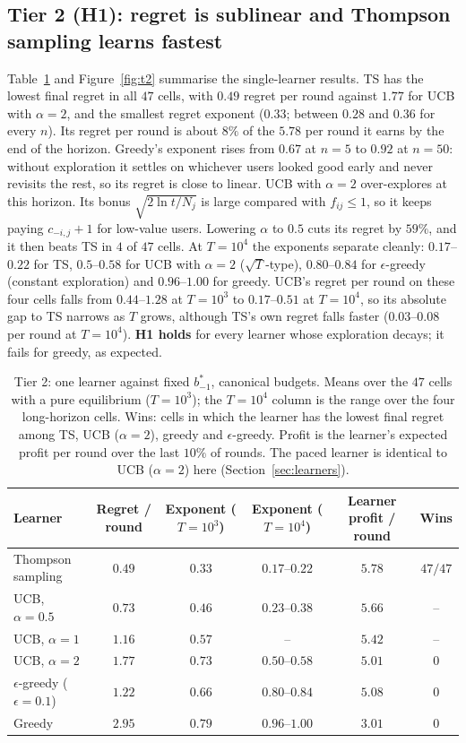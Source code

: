 \documentclass{article}
\theoremstyle{definition}
\begin{document}
\subsection{Tier 2 (H1): regret is sublinear and Thompson sampling learns fastest}
Table~\ref{tab:t2} and Figure~\ref{fig:t2} summarise the single-learner results. TS has the lowest final
regret in all $47$ cells, with $0.49$ regret per round against $1.77$ for UCB with $\alpha=2$, and the
smallest regret exponent ($0.33$; between $0.28$ and $0.36$ for every $n$). Its regret per round is
about $8\%$ of the $5.78$ per round it earns by the end of the horizon. Greedy's exponent rises from
$0.67$ at $n=5$ to $0.92$ at $n=50$: without exploration it settles on whichever users looked good early
and never revisits the rest, so its regret is close to linear. UCB with $\alpha=2$ over-explores at this
horizon. Its bonus $\sqrt{2\ln t/N_j}$ is large compared with $f_{ij}\le1$, so it keeps paying
$c_{-i,j}+1$ for low-value users. Lowering $\alpha$ to $0.5$ cuts its regret by $59\%$, and it then beats
TS in $4$ of $47$ cells. At $T=10^4$ the exponents separate cleanly: $0.17$--$0.22$ for TS, $0.5$--$0.58$
for UCB with $\alpha=2$ ($\sqrt T$-type), $0.80$--$0.84$ for $\epsilon$-greedy (constant exploration) and
$0.96$--$1.00$ for greedy. UCB's regret per round on these four cells falls from $0.44$--$1.28$ at
$T=10^3$ to $0.17$--$0.51$ at $T=10^4$, so its absolute gap to TS narrows as $T$ grows, although
TS's own regret falls faster ($0.03$--$0.08$ per round at $T=10^4$).
\textbf{H1 holds} for every learner whose exploration decays; it fails for greedy, as expected.

\begin{table}[t]
\caption{Tier 2: one learner against fixed $b^\ast_{-1}$, canonical budgets. Means over the $47$ cells
with a pure equilibrium ($T=10^3$); the $T=10^4$ column is the range over the four long-horizon cells.
Wins: cells in which the learner has the lowest final regret among TS, UCB ($\alpha=2$), greedy and
$\epsilon$-greedy. Profit is the learner's expected profit per round over the last $10\%$ of rounds. The
paced learner is identical to UCB ($\alpha=2$) here (Section~\ref{sec:learners}).}
\label{tab:t2}
\centering\small
\begin{tabular}{@{}lccccc@{}}
\toprule
Learner & Regret / round & Exponent ($T=10^3$) & Exponent ($T=10^4$) & Learner profit / round & Wins\\
\midrule
Thompson sampling & $\mathbf{0.49}$ & $\mathbf{0.33}$ & $\mathbf{0.17}$--$\mathbf{0.22}$ & $\mathbf{5.78}$ & $47/47$\\
UCB, $\alpha=0.5$ & $0.73$ & $0.46$ & $0.23$--$0.38$ & $5.66$ & --\\
UCB, $\alpha=1$ & $1.16$ & $0.57$ & -- & $5.42$ & --\\
UCB, $\alpha=2$ & $1.77$ & $0.73$ & $0.50$--$0.58$ & $5.01$ & $0$\\
$\epsilon$-greedy ($\epsilon=0.1$) & $1.22$ & $0.66$ & $0.80$--$0.84$ & $5.08$ & $0$\\
Greedy & $2.95$ & $0.79$ & $0.96$--$1.00$ & $3.01$ & $0$\\
\bottomrule
\end{tabular}
\end{table}
\end{document}
